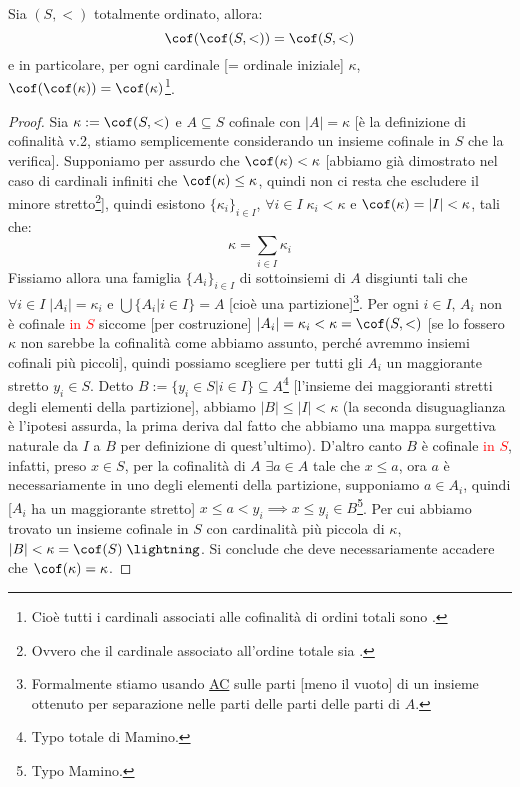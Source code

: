 \documentclass[11pt]{scrartcl}
\begin{document}
\begin{remark}
	Sia $(S,<)$ totalmente ordinato, allora:
	\[ \cof(\cof(S,<)) = \cof(S,<)
		\]
	e in particolare, per ogni cardinale [= ordinale iniziale] $\kappa$, $\cof(\cof(\kappa)) = \cof(\kappa)$\footnote{Cioè tutti i cardinali associati alle cofinalità di ordini totali sono .}.
\end{remark}

\begin{proof}
	Sia $\kappa := \cof(S,<)$ e $A \subseteq S$ cofinale con $|A| = \kappa$ [è la definizione di cofinalità v.2, stiamo semplicemente considerando un insieme cofinale in $S$ che la verifica]. Supponiamo per assurdo
	che $\cof(\kappa) < \kappa$ [abbiamo già dimostrato nel caso di cardinali infiniti che $\cof(\kappa) \leq \kappa$, quindi non ci resta che escludere il minore stretto\footnote{Ovvero che il cardinale associato all'ordine totale sia .}],
	quindi esistono $\{\kappa_i\}_{i \in I}$, $\forall i \in I \; \kappa_i < \kappa$ e $\cof(\kappa) = |I| < \kappa$, tali che:
	\[ \kappa = \sum_{i \in I} \kappa_i
		\]
	Fissiamo allora una famiglia $\{A_i\}_{i \in I}$ di sottoinsiemi di $A$ disgiunti tali che $\forall i \in I \; |A_i| = \kappa_i$ e $\bigcup\{A_i | i \in I\} = A$ [cioè una partizione]\footnote{Formalmente stiamo usando \hyperref[ax9]{AC} sulle parti [meno il vuoto] di
	un insieme ottenuto per separazione nelle parti delle parti delle parti di $A$.}. Per ogni $i \in I$, $A_i$ non è cofinale \textcolor{red}{in $S$} siccome [per costruzione] $|A_i| = \kappa_i < \kappa = \cof(S,<)$ [se lo fossero $\kappa$ non sarebbe la cofinalità come abbiamo assunto, perché avremmo insiemi cofinali più piccoli], quindi possiamo scegliere per tutti gli $A_i$ un maggiorante stretto $y_i \in S$.
	Detto $B := \{y_i \in S | i \in I\} \subseteq A$\footnote{Typo totale di Mamino.} [l'insieme dei maggioranti stretti degli elementi della partizione], abbiamo $|B| \leq |I| < \kappa$ (la seconda disuguaglianza è l'ipotesi assurda, la prima deriva dal fatto che abbiamo una mappa surgettiva naturale da $I$ a $B$ per definizione di quest'ultimo). D'altro canto $B$ è cofinale \textcolor{red}{in $S$}, infatti, preso $x \in S$, per la cofinalità di $A$
	$\exists a \in A$ tale che $x \leq a$, ora $a$ è necessariamente in uno degli elementi della partizione, supponiamo $a \in A_i$, quindi [$A_i$ ha un maggiorante stretto] $x \leq a < y_i \implies x \leq y_i \in B$\footnote{Typo Mamino.}. Per cui abbiamo trovato un insieme cofinale in $S$ con cardinalità più piccola di $\kappa$, $|B| < \kappa = \cof(S) \; \lightning$. Si conclude che deve necessariamente accadere 
	che $\cof(\kappa) = \kappa$.
\end{proof}
\end{document}
